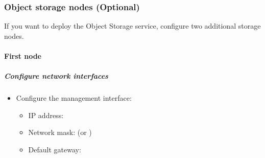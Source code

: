 \documentclass[letterpaper,10pt,english]{sphinxmanual}
\begin{document}
\subsubsection{Object storage nodes (Optional)}
\label{_source/installation_guide/environment-networking-storage-swift::doc}\label{_source/installation_guide/environment-networking-storage-swift:object-storage-nodes-optional}
If you want to deploy the Object Storage service, configure two
additional storage nodes.


\paragraph{First node}
\label{_source/installation_guide/environment-networking-storage-swift:first-node}

\subparagraph{Configure network interfaces}
\label{_source/installation_guide/environment-networking-storage-swift:configure-network-interfaces}\begin{itemize}
\item {} 
Configure the management interface:
\begin{itemize}
\item {} 
IP address: 

\item {} 
Network mask:  (or )

\item {} 
Default gateway: 

\end{itemize}

\end{itemize}
\end{document}
